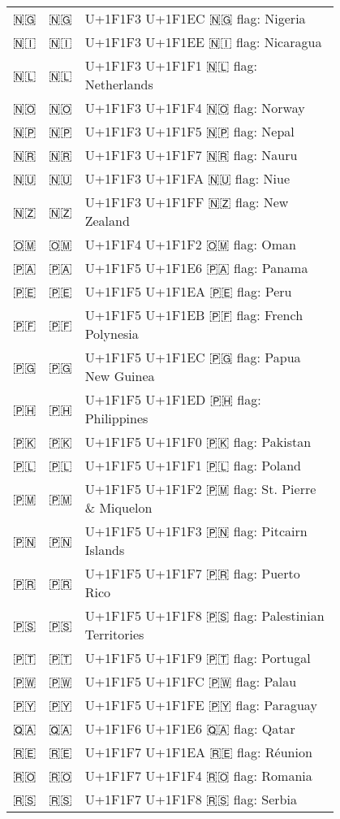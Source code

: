 \documentclass[a4paper,12pt]{article}
\newcommand{\fontA}[1]{{\fontspec[RawFeature={mode=harf,+dist,+ccmp}]{Segoe UI Emoji} #1}}
\newcommand{\fontB}[1]{{\fontspec[RawFeature={mode=harf,+dist,+ccmp}]{Noto Color Emoji} #1}}
\begin{document}
\begin{longtable}[c]{ccp{0.8\linewidth}}
\fontA{🇳🇬}&\fontB{🇳🇬}&U+1F1F3 U+1F1EC 🇳🇬 flag: Nigeria\\
\fontA{🇳🇮}&\fontB{🇳🇮}&U+1F1F3 U+1F1EE 🇳🇮 flag: Nicaragua\\
\fontA{🇳🇱}&\fontB{🇳🇱}&U+1F1F3 U+1F1F1 🇳🇱 flag: Netherlands\\
\fontA{🇳🇴}&\fontB{🇳🇴}&U+1F1F3 U+1F1F4 🇳🇴 flag: Norway\\
\fontA{🇳🇵}&\fontB{🇳🇵}&U+1F1F3 U+1F1F5 🇳🇵 flag: Nepal\\
\fontA{🇳🇷}&\fontB{🇳🇷}&U+1F1F3 U+1F1F7 🇳🇷 flag: Nauru\\
\fontA{🇳🇺}&\fontB{🇳🇺}&U+1F1F3 U+1F1FA 🇳🇺 flag: Niue\\
\fontA{🇳🇿}&\fontB{🇳🇿}&U+1F1F3 U+1F1FF 🇳🇿 flag: New Zealand\\
\fontA{🇴🇲}&\fontB{🇴🇲}&U+1F1F4 U+1F1F2 🇴🇲 flag: Oman\\
\fontA{🇵🇦}&\fontB{🇵🇦}&U+1F1F5 U+1F1E6 🇵🇦 flag: Panama\\
\fontA{🇵🇪}&\fontB{🇵🇪}&U+1F1F5 U+1F1EA 🇵🇪 flag: Peru\\
\fontA{🇵🇫}&\fontB{🇵🇫}&U+1F1F5 U+1F1EB 🇵🇫 flag: French Polynesia\\
\fontA{🇵🇬}&\fontB{🇵🇬}&U+1F1F5 U+1F1EC 🇵🇬 flag: Papua New Guinea\\
\fontA{🇵🇭}&\fontB{🇵🇭}&U+1F1F5 U+1F1ED 🇵🇭 flag: Philippines\\
\fontA{🇵🇰}&\fontB{🇵🇰}&U+1F1F5 U+1F1F0 🇵🇰 flag: Pakistan\\
\fontA{🇵🇱}&\fontB{🇵🇱}&U+1F1F5 U+1F1F1 🇵🇱 flag: Poland\\
\fontA{🇵🇲}&\fontB{🇵🇲}&U+1F1F5 U+1F1F2 🇵🇲 flag: St. Pierre \& Miquelon\\
\fontA{🇵🇳}&\fontB{🇵🇳}&U+1F1F5 U+1F1F3 🇵🇳 flag: Pitcairn Islands\\
\fontA{🇵🇷}&\fontB{🇵🇷}&U+1F1F5 U+1F1F7 🇵🇷 flag: Puerto Rico\\
\fontA{🇵🇸}&\fontB{🇵🇸}&U+1F1F5 U+1F1F8 🇵🇸 flag: Palestinian Territories\\
\fontA{🇵🇹}&\fontB{🇵🇹}&U+1F1F5 U+1F1F9 🇵🇹 flag: Portugal\\
\fontA{🇵🇼}&\fontB{🇵🇼}&U+1F1F5 U+1F1FC 🇵🇼 flag: Palau\\
\fontA{🇵🇾}&\fontB{🇵🇾}&U+1F1F5 U+1F1FE 🇵🇾 flag: Paraguay\\
\fontA{🇶🇦}&\fontB{🇶🇦}&U+1F1F6 U+1F1E6 🇶🇦 flag: Qatar\\
\fontA{🇷🇪}&\fontB{🇷🇪}&U+1F1F7 U+1F1EA 🇷🇪 flag: Réunion\\
\fontA{🇷🇴}&\fontB{🇷🇴}&U+1F1F7 U+1F1F4 🇷🇴 flag: Romania\\
\fontA{🇷🇸}&\fontB{🇷🇸}&U+1F1F7 U+1F1F8 🇷🇸 flag: Serbia\\

\end{longtable}
\end{document}
